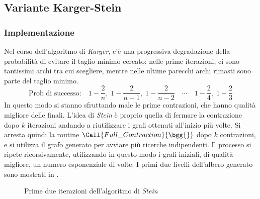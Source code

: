 \subsection{Variante Karger-Stein}

\subsubsection{Implementazione}

Nel corso dell'algoritmo di \emph{Karger}, c'è una progressiva degradazione della probabilità di evitare il taglio minimo cercato: nelle prime iterazioni, ci sono tantissimi archi tra cui scegliere, mentre nelle ultime parecchi archi rimasti sono parte del taglio minimo.
\begin{equation*}
    \text{Prob di successo:}
    \quad
    1 - \frac{2}{n}
    ,
    \;
    1 - \frac{2}{n-1}
    ,
    \;
    1 - \frac{2}{n-2}
    \quad
    \cdots
    \quad
    1 - \frac{2}{4}
    ,
    \;
    1 - \frac{2}{3}
\end{equation*}
In questo modo si stanno sfruttando male le prime contrazioni, che hanno qualità migliore delle finali.
L'idea di \emph{Stein} è proprio quella di fermare la contrazione dopo $k$ iterazioni
andando a riutilizzare i grafi ottenuti all'inizio più volte.
Si arresta quindi la routine $
\Call{Full\_Contraction}{\bgg{}}
$ dopo $k$ contrazioni, e si utilizza il grafo generato per avviare più ricerche indipendenti.
Il processo si ripete ricorsivamente, utilizzando in questo modo i grafi iniziali, di qualità migliore, un numero esponenziale di volte.
I primi due livelli dell'albero generato sono mostrati in .
\begin{figure}[h]
    \centering
    \caption{Prime due iterazioni dell'algoritmo di \emph{Stein}}
    \label{fig:contrazione_stein}
\end{figure}
